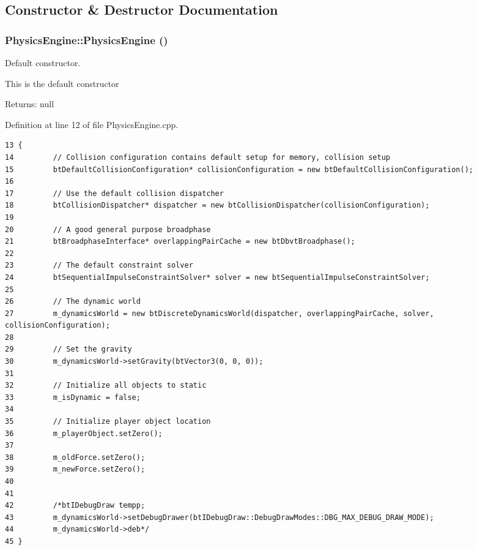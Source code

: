 \subsection{Constructor \& Destructor Documentation}
\hypertarget{class_physics_engine_7fc9180ea453680df0b863fa157c5b92}{
\subsubsection[PhysicsEngine]{\setlength{\rightskip}{0pt plus 5cm}PhysicsEngine::PhysicsEngine ()}}
\label{class_physics_engine_7fc9180ea453680df0b863fa157c5b92}


Default constructor. 

This is the default constructor

\begin{Desc}
\item[Returns:]null \end{Desc}


Definition at line 12 of file PhysicsEngine.cpp.

\begin{Code}\begin{verbatim}13 {
14         // Collision configuration contains default setup for memory, collision setup
15         btDefaultCollisionConfiguration* collisionConfiguration = new btDefaultCollisionConfiguration();
16 
17         // Use the default collision dispatcher
18         btCollisionDispatcher* dispatcher = new btCollisionDispatcher(collisionConfiguration);
19 
20         // A good general purpose broadphase
21         btBroadphaseInterface* overlappingPairCache = new btDbvtBroadphase();
22 
23         // The default constraint solver
24         btSequentialImpulseConstraintSolver* solver = new btSequentialImpulseConstraintSolver;
25 
26         // The dynamic world
27         m_dynamicsWorld = new btDiscreteDynamicsWorld(dispatcher, overlappingPairCache, solver, collisionConfiguration);
28 
29         // Set the gravity
30         m_dynamicsWorld->setGravity(btVector3(0, 0, 0));
31 
32         // Initialize all objects to static
33         m_isDynamic = false;
34 
35         // Initialize player object location
36         m_playerObject.setZero();
37 
38         m_oldForce.setZero();
39         m_newForce.setZero();
40 
41 
42         /*btIDebugDraw tempp;
43         m_dynamicsWorld->setDebugDrawer(btIDebugDraw::DebugDrawModes::DBG_MAX_DEBUG_DRAW_MODE);
44         m_dynamicsWorld->deb*/
45 }
\end{verbatim}
\end{Code}


